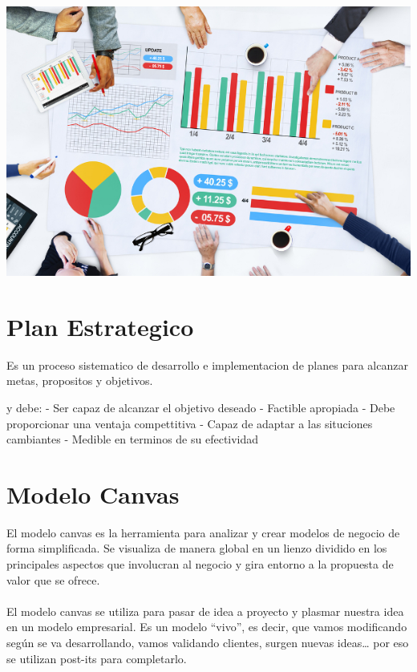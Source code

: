 \begin{center}
\includegraphics[width=15cm]{./Imagenes/imagen3}
\end{center}

\section{Plan Estrategico}
\item{Es un proceso sistematico de desarrollo e implementacion de planes para alcanzar metas, propositos y objetivos.}

\item{ y debe:}
- Ser capaz de alcanzar el objetivo deseado
- Factible apropiada
- Debe proporcionar una ventaja compettitiva
- Capaz de adaptar a las situciones cambiantes
- Medible en terminos de su efectividad

\section{Modelo Canvas}
\item{
El modelo canvas es la herramienta para analizar y crear modelos de negocio de forma simplificada. Se visualiza de manera global en un lienzo dividido en los principales aspectos que involucran al negocio y gira entorno a la propuesta de valor que se ofrece.\\\\
El modelo canvas se utiliza para pasar de idea a proyecto y plasmar nuestra idea en un modelo empresarial. Es un modelo “vivo”, es decir, que vamos modificando según se va desarrollando, vamos validando clientes, surgen nuevas ideas… por eso se utilizan post-its para completarlo.
}

